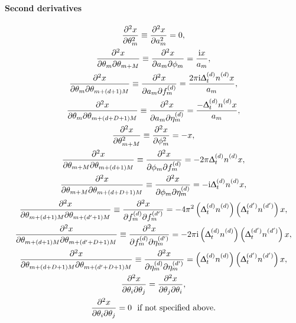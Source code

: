 \paragraph{Second derivatives}
\begin{subequations}
    \begin{gather}
        \xderivtwosame{\theta_{m}} \equiv
            \xderivtwosame{a_m} =
            0,
            \label{eq:amp-second-deriv}\\
        \xderivtwodiff{\theta_{m}}{\theta_{m + M}} \equiv
            \xderivtwodiff{a_m}{\phi_m} =
            \frac{\iu x}{a_m},\\
        \xderivtwodiff{\theta_{m}}{\theta_{m + (d + 1)M}} \equiv
            \xderivtwodiff{a_m^{\vphantom{(d)}}}{\fdm} =
            \frac{2 \pi \iu \Dtd \nd x}{a_m},\\
        \xderivtwodiff{\theta_{m}}{\theta_{m + (d + D + 1)M}} \equiv
            \xderivtwodiff{a_m^{\vphantom{(d)}}}{\etadm} =
            \frac{-\Dtd \nd x}{a_m},\\
        \xderivtwosame{\theta_{m + M}} \equiv
            \xderivtwosame{\phi_m} =
            -x,\\
        \xderivtwodiff{\theta_{m + M}}{\theta_{m + (d + 1)M}} \equiv
            \xderivtwodiff{\phi_m^{\vphantom{(d)}}}{\fdm} =
            -2 \pi \Dtd \nd x,\\
        \xderivtwodiff{\theta_{m + M}}{\theta_{m + (d + D + 1)M}} \equiv
            \xderivtwodiff{\phi_m^{\vphantom{(d)}}}{\etadm} =
            -\iu \Dtd \nd x,\\
        \xderivtwodiff{\theta_{m + (d + 1)M}}{\theta_{m + (d^{\prime} + 1)M}} \equiv
            \xderivtwodiff{\fdm}{\fdmp} =
            -4\pi^2 \left(\Dtd \nd \right) \left(\Dtdp \ndp \right) x,\\
        \xderivtwodiff{\theta_{m + (d + 1)M}}{\theta_{m + (d^{\prime} + D + 1)M}} \equiv
            \xderivtwodiff{\fdm}{\etadmp} =
            -2 \pi \iu \left(\Dtd \nd \right) \left(\Dtdp \ndp \right) x,\\
        \xderivtwodiff{\theta_{m + (d + D + 1)M}}{\theta_{m + (d^{\prime} + D + 1)M}} \equiv
            \xderivtwodiff{\etadm}{\etadmp} =
            \left(\Dtd \nd \right) \left(\Dtdp \ndp \right) x,\\
        \xderivtwodiff{\theta_{i}}{\theta_{j}} =
            \xderivtwodiff{\theta_{j}}{\theta_{i}},
            \label{eq:symmetric-second-derivs}\\
        \xderivtwodiff{\theta_{i}}{\theta_{j}} = 0\ \text{ if not specified above.}
        \label{eq:zero-second-deriv}
    \end{gather}
\end{subequations}
